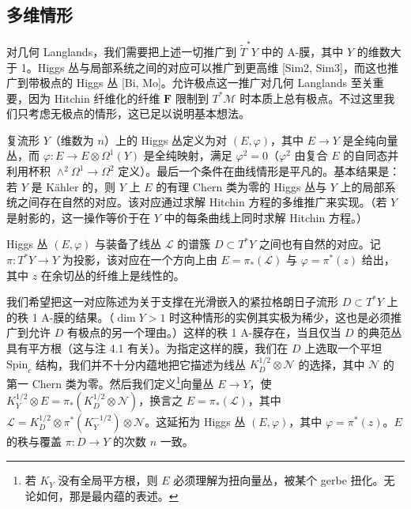 \documentclass[11pt,a4paper]{article}
\begin{document}

\subsection{多维情形}

对几何 Langlands，我们需要把上述一切推广到 $\widetilde{T}^*Y$ 中的 A-膜，其中 $Y$ 的维数大于 1。Higgs 丛与局部系统之间的对应可以推广到更高维 [Sim2, Sim3]，而这也推广到带极点的 Higgs 丛 [Bi, Mo]。允许极点这一推广对几何 Langlands 至关重要，因为 Hitchin 纤维化的纤维 $\boldsymbol{F}$ 限制到 $T^*\mathcal{M}$ 时本质上总有极点。不过这里我们只考虑无极点的情形，这已足以说明基本想法。

复流形 $Y$（维数为 $n$）上的 Higgs 丛定义为对 $(E,\varphi)$，其中 $E\to Y$ 是全纯向量丛，而 $\varphi:E\to E\otimes\Omega^1(Y)$ 是全纯映射，满足 $\varphi^2=0$（$\varphi^2$ 由复合 $E$ 的自同态并利用杯积 $\wedge^2\Omega^1\to\Omega^2$ 定义）。最后一个条件在曲线情形是平凡的。基本结果是：若 $Y$ 是 Kähler 的，则 $Y$ 上 $E$ 的有理 Chern 类为零的 Higgs 丛与 $Y$ 上的局部系统之间存在自然的对应。该对应通过求解 Hitchin 方程的多维推广来实现。（若 $Y$ 是射影的，这一操作等价于在 $Y$ 中的每条曲线上同时求解 Hitchin 方程。）

Higgs 丛 $(E,\varphi)$ 与装备了线丛 $\mathcal{L}$ 的谱簇 $D\subset T^*Y$ 之间也有自然的对应。记 $\pi:T^*Y\to Y$ 为投影，该对应在一个方向上由 $E=\pi_*(\mathcal{L})$ 与 $\varphi=\pi^*(z)$ 给出，其中 $z$ 在余切丛的纤维上是线性的。

我们希望把这一对应陈述为关于支撑在光滑嵌入的紧拉格朗日子流形 $D\subset T^*Y$ 上的秩 1 A-膜的结果。（$\dim Y>1$ 时这种情形的实例其实极为稀少，这也是必须推广到允许 $D$ 有极点的另一个理由。）这样的秩 1 A-膜存在，当且仅当 $D$ 的典范丛具有平方根（这与注 4.1 有关）。为指定这样的膜，我们在 $D$ 上选取一个平坦 $\mathrm{Spin}_c$ 结构，我们并不十分内蕴地把它描述为线丛 $K_D^{1/2}\otimes\mathcal{N}$ 的选择，其中 $\mathcal{N}$ 的第一 Chern 类为零。然后我们定义\footnote{若 $K_Y$ 没有全局平方根，则 $E$ 必须理解为扭向量丛，被某个 gerbe 扭化。无论如何，那是最内蕴的表述。}向量丛 $E\to Y$，使 $K_Y^{1/2}\otimes E=\pi_*(K_D^{1/2}\otimes\mathcal{N})$，换言之 $E=\pi_*(\mathcal{L})$，其中 $\mathcal{L}=K_D^{1/2}\otimes\pi^*(K_Y^{-1/2})\otimes\mathcal{N}$。这延拓为 Higgs 丛 $(E,\varphi)$，其中 $\varphi=\pi^*(z)$。$E$ 的秩与覆盖 $\pi:D\to Y$ 的次数 $n$ 一致。
\end{document}
